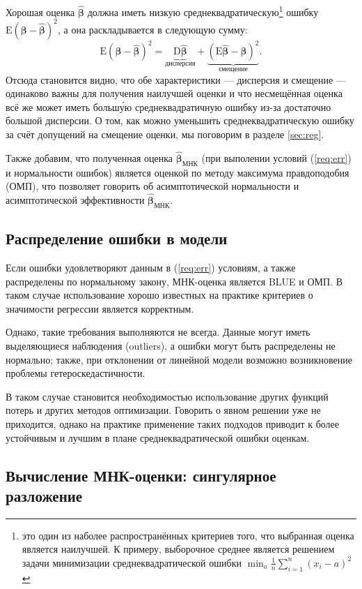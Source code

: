 \documentclass[12pt,a4paper,final]{article}
\newcommand{\betah}{\hat{\bm \beta}}
\newcommand{\betaa}{\bm{\beta}}
\newcommand{\E}{\mathrm{E}}
\newcommand{\1}{\mathds{1}}
\begin{document}
Хорошая оценка $\betah$ должна иметь низкую среднеквадратическую\footnote{это один из наболее распространённых критериев того, что выбранная оценка является наилучшей. К примеру, выборочное среднее является решением задачи минимизации среднеквадратической ошибки $\min_{a}\frac{1}{n}\sum_{i = 1}^n (x_i - a)^2$} ошибку $\E (\betaa - \betah)^2$, а она раскладывается в следующую сумму:
\begin{equation}
\label{eq:mse}
\E(\betaa - \betah)^2 = \underbrace{\mathrm D \betah}_{\text{дисперсия}} + \underbrace{(\mathrm E \betah - \betaa)^2}_{\text{смещение}}.
\end{equation}
Отсюда становится видно, что обе характеристики --- дисперсия и смещение --- одинаково важны для получения наилучшей оценки и что несмещённая оценка всё же может иметь больш\'{у}ю среднеквадратичную ошибку из-за достаточно большой дисперсии. О том, как можно уменьшить среднеквадратическую ошибку за счёт допущений на смещение оценки, мы поговорим в разделе \ref{sec:reg}.

Также добавим, что полученная оценка $\betah_{\text{МНК}}$ (при выполении условий (\ref{req:err}) и нормальности ошибок) является оценкой по методу максимума правдоподобия (ОМП), что позволяет говорить об асимптотической нормальности и асимптотической эффективности $\betah_{\text{МНК}}$.

\subsection{Распределение ошибки в модели}
Если ошибки удовлетворяют данным в (\ref{req:err}) условиям, а также распределены по нормальному закону, МНК-оценка является BLUE и ОМП. В таком случае использование  хорошо известных на практике критериев о значимости регрессии является корректным.

Однако, такие требования выполняются не всегда. Данные могут иметь выделяющиеся наблюдения (outliers), а ошибки могут быть распределены не нормально; также, при отклонении от линейной модели возможно возникновение проблемы гетероскедастичности. 

В таком случае становится необходимостью использование других функций потерь и других методов оптимизации. Говорить о явном решении уже не приходится, однако на практике применение таких подходов приводит к более устойчивым и лучшим в плане среднеквадратической ошибки оценкам.

\subsection{Вычисление МНК-оценки: сингулярное разложение}
\end{document}
